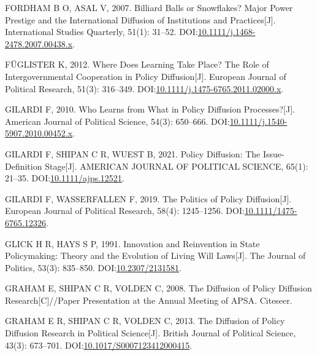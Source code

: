 \documentclass[
  12pt,
]{ctexart}
\newlength{\cslhangindent}
\newlength{\cslentryspacingunit} %
\newenvironment{CSLReferences}[2] %
 {%
  \setlength{\parindent}{0pt}
  \ifodd #1
  \let\oldpar\par
  \def\par{\hangindent=\cslhangindent\oldpar}
  \fi
  \setlength{\parskip}{#2\cslentryspacingunit}
 }%
 {}
\begin{document}
\begin{CSLReferences}{1}{0}
\leavevmode{}%
FORDHAM B O, ASAL V, 2007. Billiard {Balls} or {Snowflakes}? {Major Power Prestige} and the {International Diffusion} of {Institutions} and {Practices}{[}J{]}. International Studies Quarterly, 51(1): 31--52. DOI:\href{https://doi.org/10.1111/j.1468-2478.2007.00438.x}{10.1111/j.1468-2478.2007.00438.x}.

\leavevmode{}%
FÜGLISTER K, 2012. Where Does Learning Take Place? {The} Role of Intergovernmental Cooperation in Policy Diffusion{[}J{]}. European Journal of Political Research, 51(3): 316--349. DOI:\href{https://doi.org/10.1111/j.1475-6765.2011.02000.x}{10.1111/j.1475-6765.2011.02000.x}.

\leavevmode{}%
GILARDI F, 2010. Who {Learns} from {What} in {Policy Diffusion Processes}?{[}J{]}. American Journal of Political Science, 54(3): 650--666. DOI:\href{https://doi.org/10.1111/j.1540-5907.2010.00452.x}{10.1111/j.1540-5907.2010.00452.x}.

\leavevmode{}%
GILARDI F, SHIPAN C R, WUEST B, 2021. Policy {Diffusion}: {The Issue-Definition Stage}{[}J{]}. AMERICAN JOURNAL OF POLITICAL SCIENCE, 65(1): 21--35. DOI:\href{https://doi.org/10.1111/ajps.12521}{10.1111/ajps.12521}.

\leavevmode{}%
GILARDI F, WASSERFALLEN F, 2019. The Politics of Policy Diffusion{[}J{]}. European Journal of Political Research, 58(4): 1245--1256. DOI:\href{https://doi.org/10.1111/1475-6765.12326}{10.1111/1475-6765.12326}.

\leavevmode{}%
GLICK H R, HAYS S P, 1991. Innovation and {Reinvention} in {State Policymaking}: {Theory} and the {Evolution} of {Living Will Laws}{[}J{]}. The Journal of Politics, 53(3): 835--850. DOI:\href{https://doi.org/10.2307/2131581}{10.2307/2131581}.

\leavevmode{}%
GRAHAM E, SHIPAN C R, VOLDEN C, 2008. The Diffusion of Policy Diffusion Research{[}C{]}//Paper Presentation at the {Annual Meeting} of {APSA}. {Citeseer}.

\leavevmode{}%
GRAHAM E R, SHIPAN C R, VOLDEN C, 2013. The {Diffusion} of {Policy Diffusion Research} in {Political Science}{[}J{]}. British Journal of Political Science, 43(3): 673--701. DOI:\href{https://doi.org/10.1017/S0007123412000415}{10.1017/S0007123412000415}.


\end{CSLReferences}
\end{document}
